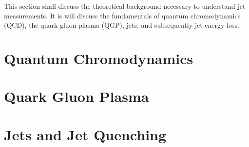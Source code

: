 
This section shall discuss the theoretical background necessary to understand jet measurements. It is will discuss the fundamentals of quantum chromodynamics (QCD), the quark gluon plasma (QGP),  jets, and subsequently jet energy loss. 


\section{Quantum Chromodynamics}
\label{sec:qcd}


\section{Quark Gluon Plasma}
\label{sec:qgp}


\section{Jets and Jet Quenching}
\label{sec:jets}

